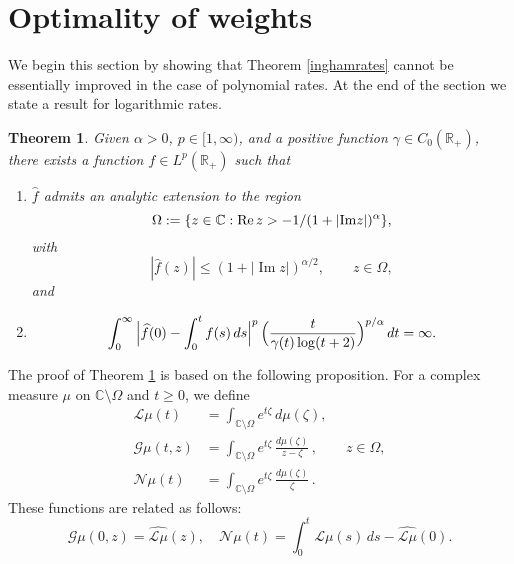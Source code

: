 \documentclass[11pt]{amsart}
\newtheorem{theorem}{Theorem}[section]
\theoremstyle{definition}
\theoremstyle{remark}
\numberwithin{equation}{section}
\begin{document}
\section{Optimality of weights}\label{se5}

We begin this section by showing that Theorem \ref{inghamrates} cannot be essentially improved in the case of polynomial rates.  At the end of the section we state a result for logarithmic rates.

\begin{theorem}\label{example}
Given $\alpha>0$, $p\in [1,\infty)$, and a positive function $\gamma
\in C_0(\mathbb R_+)$, there exists a function $f\in L^p (\mathbb
R_+)$ such that
\begin{enumerate} [\rm(a)]
\item \label{51a} $ \widehat f$ admits an analytic extension to the region
$$
\Omega:=\{z\in\mathbb C: {\rm Re}\, z >  -1/(1+|{\operatorname{Im}} z|)^\alpha\},
$$
with
\begin{equation}  \label{fhatbd}
| \widehat f (z)| \le (1 +  |{\operatorname{Im}} z|)^{\alpha/2}, \qquad z\in \Omega,
\end{equation}
and
\item \label{51b}
$$
\int_0^\infty  \Big|\widehat f(0) - \int_{0}^{t} f(s) \, ds\Big|^p \, \Bigl(\frac{t}{\gamma(t)\log (t+2)}\Bigr)^{p/\alpha}
\,dt=\infty.
$$
\end{enumerate}
\end{theorem}

The proof of Theorem \ref{example} is based on the following
proposition.   For a complex measure $\mu$ on ${{\mathbb C}} \setminus \Omega$ and $t\ge0$, we define
\begin{align}
\label{Lmu}
{{\mathcal L}}\mu(t) &= \int_{\mathbb C \setminus
\Omega} e^{t\zeta}\,d\mu(\zeta), \\
 \label{Gmu}
\mathcal G\mu(t,z) &=\int_{\mathbb C \setminus \Omega} e^{t
\zeta}\,\frac{d\mu(\zeta)}{z-\zeta} \,,  \qquad z \in \Omega, \\
\label{Nmu}
{{\mathcal N}}\mu(t) &= \int_{\mathbb C \setminus
\Omega}
e^{t\zeta}\,\frac{d\mu(\zeta)}{\zeta} \,.
\end{align}
These functions are related as follows:
\begin{equation} \label{GNmu}
\mathcal G\mu(0,z) = \widehat{{{\mathcal L}}\mu}(z),  \quad {{\mathcal N}}\mu(t) =  \int_0^t {{\mathcal L}}\mu(s) \,ds - \widehat{{{\mathcal L}}\mu}(0).
\end{equation}
\end{document}
